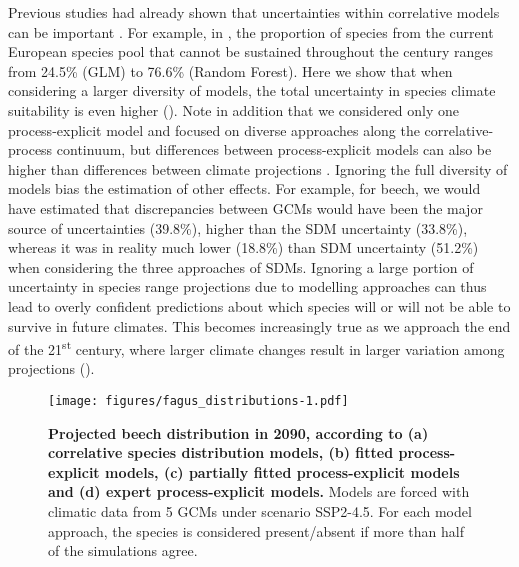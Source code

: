 \documentclass[letterpaper,8pt]{article}  %
\begin{document}
\begin{doublespacing}
\begin{linenumbers}
Previous studies had already shown that uncertainties within correlative models can be important  \citep{Thuiller2019}. For example, in \citet{Wessely2024}, the proportion of species from the current European species pool that cannot be sustained throughout the century ranges from 24.5\% (GLM) to 76.6\% (Random Forest). Here we show that when considering a larger diversity of models, the total uncertainty in species climate suitability is even higher (). Note in addition that we considered only one process-explicit model and focused on diverse approaches along the correlative-process continuum, but differences between process-explicit models can also be higher than differences between climate projections \citep{Asseng2013}. Ignoring the full diversity of models bias the estimation of other effects. For example, for beech, we would have estimated that discrepancies between GCMs would have been the major source of uncertainties (39.8\%), higher than the SDM uncertainty (33.8\%), whereas it was in reality much lower (18.8\%) than SDM uncertainty (51.2\%) when considering the three approaches of SDMs. Ignoring a large portion of uncertainty in species range projections due to modelling approaches can thus lead to overly confident predictions about which species will or will not be able to survive in future climates.  This becomes increasingly true as we approach the end of the 21\textsuperscript{st} century, where larger climate changes result in larger variation among projections ().

\begin{figure}[t]
\hspace*{-2cm}
\begin{subcaptiongroup}
\label{fig:fagusA} 
\label{fig:fagusB}
\label{fig:fagusC}
\end{subcaptiongroup}
\texttt{[image: figures/fagus\_distributions-1.pdf]}
\caption{\textbf{Projected beech distribution in 2090, according to (a) correlative species distribution models, (b) fitted process-explicit models, (c) partially fitted process-explicit models and (d) expert process-explicit models.} Models are forced with climatic data from 5 GCMs under scenario SSP2-4.5. For each model approach, the species is considered present/absent if more than half of the simulations agree.}
\label{fig:fagus}
\end{figure}


\end{linenumbers}
\end{doublespacing}
\end{document}
